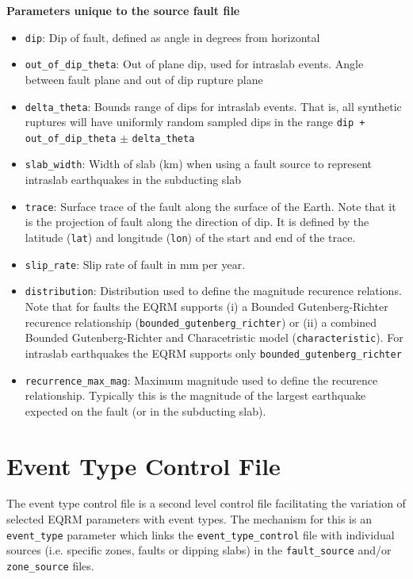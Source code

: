 \textbf{Parameters unique to the source fault file}
\begin{itemize}
\item \texttt{dip}: Dip of fault, defined as angle in degrees from horizontal
\item \texttt{out\_of\_dip\_theta}: Out of plane dip, used for intraslab events. Angle between fault plane
and out of dip rupture plane
\item \texttt{delta\_theta}: Bounds range of dips for intraslab events. That is,
all synthetic ruptures will have uniformly random sampled dips in
the range \texttt{dip + out\_of\_dip\_theta} $\pm$
\texttt{delta\_theta}
\item \texttt{slab\_width}: Width of slab (km) when using a fault source to represent intraslab
earthquakes in the subducting slab
\item \texttt{trace}: Surface trace of the fault along the surface
of the Earth. Note that it is the projection of fault along the
direction of dip. It is defined by the latitude (\texttt{lat}) and
longitude (\texttt{lon}) of the start and end of the trace.
\item \texttt{slip\_rate}: Slip rate of fault in mm per year.
\item \texttt{distribution}: Distribution used to define the magnitude recurence relations. Note that
for faults the EQRM supports (i) a Bounded Gutenberg-Richter
recurence relationship
(\texttt{bounded}\texttt{\_gutenberg}\texttt{\_richter}) or (ii) a
combined Bounded Gutenberg-Richter and Characetristic model
(\texttt{characteristic}). For intraslab earthquakes the EQRM
supports only \texttt{bounded}\texttt{\_gutenberg}\texttt{\_richter}
\item \texttt{recurrence\_max\_mag}: Maximum magnitude used to
define the recurence relationship. Typically this is the magnitude
of the largest earthquake expected on the fault (or in the
subducting slab).
\end{itemize}

\section{Event Type Control File}

The event type control file is a second level control file
facilitating the variation of selected EQRM parameters with event
types. The mechanism for this is an \texttt{event\_type} parameter
which links the \texttt{event\_type\_control} file with individual
sources (i.e. specific zones, faults or dipping slabs) in the
\texttt{fault\_source} and/or \texttt{zone\_source} files.


